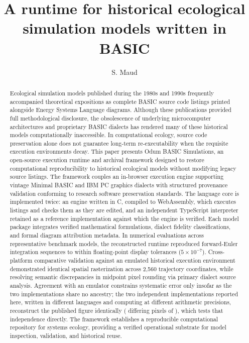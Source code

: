 \documentclass[3p,times,authoryear,twocolumn]{elsarticle}
\begin{document}
\begin{frontmatter}

\title{A runtime for historical ecological simulation models written in BASIC}

\author{S. Maud}


\begin{abstract}
Ecological simulation models published during the 1980s and 1990s frequently accompanied theoretical expositions as complete BASIC source code listings printed alongside Energy Systems Language diagrams. Although these publications provided full methodological disclosure, the obsolescence of underlying microcomputer architectures and proprietary BASIC dialects has rendered many of these historical models computationally inaccessible. In computational ecology, source code preservation alone does not guarantee long-term re-executability when the requisite execution environments decay. This paper presents Odum BASIC Simulations, an open-source execution runtime and archival framework designed to restore computational reproducibility to historical ecological models without modifying legacy source listings. The framework couples an in-browser execution engine supporting vintage Minimal BASIC and IBM PC graphics dialects with structured provenance validation conforming to research software preservation standards. The language core is implemented twice: an engine written in C, compiled to WebAssembly, which executes listings and checks them as they are edited, and an independent TypeScript interpreter retained as a reference implementation against which the engine is verified. Each model package integrates verified mathematical formulations, dialect fidelity classifications, and formal diagram attribution metadata. In numerical evaluations across representative benchmark models, the reconstructed runtime reproduced forward-Euler integration sequences to within floating-point display tolerances ($5\times10^{-7}$). Cross-platform comparative validation against an emulated historical execution environment demonstrated identical spatial rasterization across 2,560 trajectory coordinates, while resolving semantic discrepancies in midpoint pixel rounding via primary dialect source analysis. Agreement with an emulator constrains systematic error only insofar as the two implementations share no ancestry; the two independent implementations reported here, written in different languages and computing at different arithmetic precisions, reconstruct the published figure identically (\oracleEnginesDiffering{} differing pixels of \oracleScreenPixels{}), which tests that independence directly. The framework establishes a reproducible computational repository for systems ecology, providing a verified operational substrate for model inspection, validation, and historical reuse.
\end{abstract}


\end{frontmatter}
\end{document}
